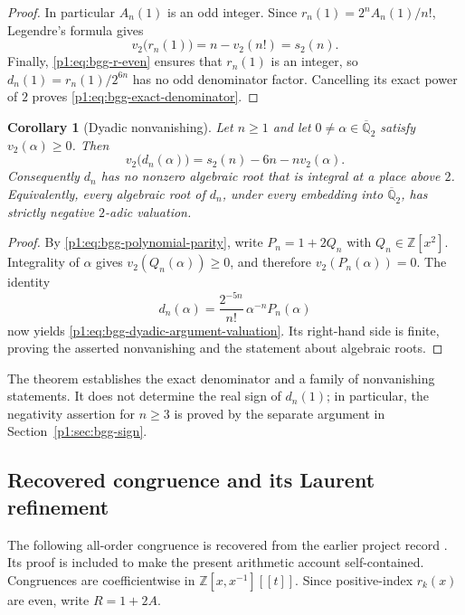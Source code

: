 \documentclass[11pt,a4paper]{article}
\newtheorem{corollary}[theorem]{Corollary}
\theoremstyle{definition}
\theoremstyle{remark}
\newcommand{\Z}{\mathbb Z}
\numberwithin{equation}{section}
\begin{document}
\begin{proof}
In particular $A_n(1)$ is an odd integer.  Since
$r_n(1)=2^n A_n(1)/n!$, Legendre's formula gives
\[
 v_2\bigl(r_n(1)\bigr)=n-v_2(n!)=s_2(n).
\]
Finally, \eqref{p1:eq:bgg-r-even} ensures that $r_n(1)$ is an integer, so
$d_n(1)=r_n(1)/2^{6n}$ has no odd denominator factor.  Cancelling its exact
power of $2$ proves \eqref{p1:eq:bgg-exact-denominator}.
\end{proof}

\begin{corollary}[Dyadic nonvanishing]
\label{p1:cor:bgg-dyadic-roots}
Let $n\geq1$ and let $0\ne\alpha\in\overline{\mathbb Q}_2$ satisfy
$v_2(\alpha)\geq0$.  Then
\begin{equation}
 \label{p1:eq:bgg-dyadic-argument-valuation}
 v_2\bigl(d_n(\alpha)\bigr)
 =s_2(n)-6n-nv_2(\alpha).
\end{equation}
Consequently $d_n$ has no nonzero algebraic root that is integral at a
place above $2$.  Equivalently, every algebraic root of $d_n$, under every
embedding into $\overline{\mathbb Q}_2$, has strictly negative $2$-adic
valuation.
\end{corollary}

\begin{proof}
By \eqref{p1:eq:bgg-polynomial-parity}, write $P_n=1+2Q_n$ with
$Q_n\in\mathbb Z[x^2]$.  Integrality of $\alpha$ gives
$v_2(Q_n(\alpha))\geq0$, and therefore $v_2(P_n(\alpha))=0$.
The identity
\[
 d_n(\alpha)=\frac{2^{-5n}}{n!}\,\alpha^{-n}P_n(\alpha)
\]
now yields \eqref{p1:eq:bgg-dyadic-argument-valuation}.  Its right-hand side
is finite, proving the asserted nonvanishing and the statement about
algebraic roots.
\end{proof}

The theorem establishes the exact denominator and a family of nonvanishing
statements.  It does not determine the real sign of $d_n(1)$; in particular,
the negativity assertion for $n\geq3$ is proved by the separate argument in Section~\ref{p1:sec:bgg-sign}.

\subsection{Recovered congruence and its Laurent refinement}
The following all-order congruence is recovered from the earlier project
record \cite{p1:priorTransfer}. Its proof is included to make the present
arithmetic account self-contained. Congruences are coefficientwise in
$\Z[x,x^{-1}][[t]]$.
Since positive-index $r_k(x)$ are even, write $R=1+2A$.
\end{document}

